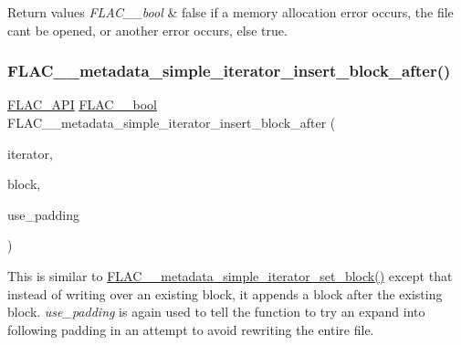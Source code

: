 \begin{DoxyRetVals}{Return values}
{\em F\+L\+A\+C\+\_\+\+\_\+bool} & {\ttfamily false} if a memory allocation error occurs, the file can\textquotesingle{}t be opened, or another error occurs, else {\ttfamily true}. \\
\hline
\end{DoxyRetVals}
\mbox{\label{group__flac__metadata__level1_ga1239ccc5ae1dc3f7cb0e1a61707fafc6}} 
\subsubsection{\texorpdfstring{F\+L\+A\+C\+\_\+\+\_\+metadata\+\_\+simple\+\_\+iterator\+\_\+insert\+\_\+block\+\_\+after()}{FLAC\_\_metadata\_simple\_iterator\_insert\_block\_after()}}
{\footnotesize\ttfamily \hyperlink{group__flac__export_ga56ca07df8a23310707732b1c0007d6f5}{F\+L\+A\+C\+\_\+\+A\+PI} \hyperlink{ordinals_8h_a95103469f1cbd78b8cf250194985b34e}{F\+L\+A\+C\+\_\+\+\_\+bool} F\+L\+A\+C\+\_\+\+\_\+metadata\+\_\+simple\+\_\+iterator\+\_\+insert\+\_\+block\+\_\+after (\begin{DoxyParamCaption}\item[{\hyperlink{group__flac__metadata__level1_ga6accccddbb867dfc2eece9ee3ffecb3a}{F\+L\+A\+C\+\_\+\+\_\+\+Metadata\+\_\+\+Simple\+Iterator} $\ast$}]{iterator,  }\item[{\hyperlink{struct_f_l_a_c_____stream_metadata}{F\+L\+A\+C\+\_\+\+\_\+\+Stream\+Metadata} $\ast$}]{block,  }\item[{\hyperlink{ordinals_8h_a95103469f1cbd78b8cf250194985b34e}{F\+L\+A\+C\+\_\+\+\_\+bool}}]{use\+\_\+padding }\end{DoxyParamCaption})}

This is similar to \hyperlink{group__flac__metadata__level1_ga7d1ceb2db292c968ae6ac18ecb15c356}{F\+L\+A\+C\+\_\+\+\_\+metadata\+\_\+simple\+\_\+iterator\+\_\+set\+\_\+block()} except that instead of writing over an existing block, it appends a block after the existing block. {\itshape use\+\_\+padding} is again used to tell the function to try an expand into following padding in an attempt to avoid rewriting the entire file.

